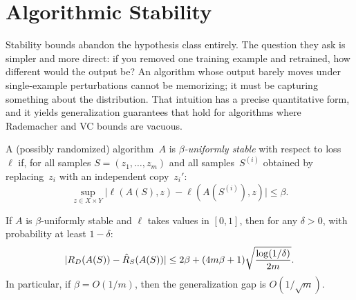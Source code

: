 
\section{Algorithmic Stability}
\label{sec:stability}

Stability bounds abandon the hypothesis class entirely. The question they ask is simpler and more direct: if you removed one training example and retrained, how different would the output be? An algorithm whose output barely moves under single-example perturbations cannot be memorizing; it must be capturing something about the distribution. That intuition has a precise quantitative form, and it yields generalization guarantees that hold for algorithms where Rademacher and VC bounds are vacuous.

\begin{defn}
\label{def:uniform-stability}
A (possibly randomized) algorithm~$A$ is \emph{$\beta$-uniformly stable}
with respect to loss~$\ell$ if, for all samples
$S = (z_1, \ldots, z_m)$ and all samples~$S^{(i)}$ obtained by
replacing~$z_i$ with an independent copy~$z_i'$:
\[
  \sup_{z \in X \times Y}
    \bigl|\ell(A(S), z) - \ell(A(S^{(i)}), z)\bigr|
  \leq \beta.
\]
\end{defn}

\begin{thm}
\label{thm:stability-bound}
If $A$ is $\beta$-uniformly stable and $\ell$ takes values in $[0,1]$,
then for any $\delta > 0$, with probability at least $1 - \delta$:
\[
  |R_D(A(S)) - \hat{R}_S(A(S))|
  \leq 2\beta + (4m\beta + 1)\sqrt{\frac{\log(1/\delta)}{2m}}.
\]
In particular, if $\beta = O(1/m)$, then the generalization gap is
$O(1/\sqrt{m})$.
\end{thm}

